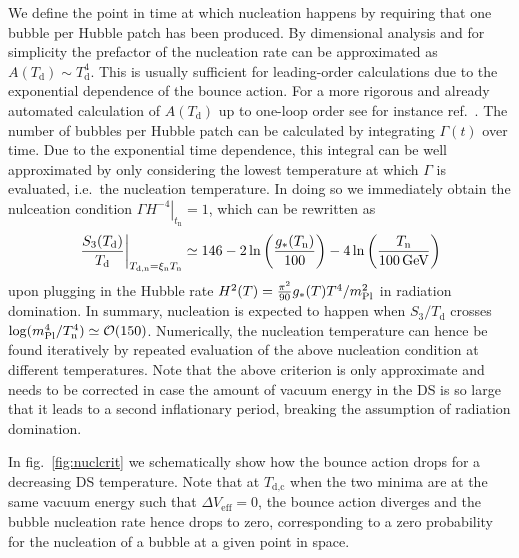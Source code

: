 We define the point in time at which nucleation happens by requiring that one bubble per Hubble patch has been produced. By dimensional analysis and for simplicity the prefactor of the nucleation rate can be approximated as $A(T_\mathrm{d}) \sim T_\mathrm{d}^4$. This is usually sufficient for leading-order calculations due to the exponential dependence of the bounce action. For a more rigorous and already automated calculation of $A(T_\text{d})$ up to one-loop order see for instance ref.~\cite{Ekstedt:2023sqc}. The number of  bubbles per Hubble patch can be calculated by integrating $\Gamma(t)$ over time. Due to the exponential time dependence, this integral can be well approximated by only considering the lowest temperature at which $\Gamma$ is evaluated, i.e.~the nucleation temperature. In doing so we immediately obtain the nulceation condition $\left. \Gamma H^{-4}\right|_{t_\text{n}} = 1$, which can be rewritten as~\cite{Caprini:2015zlo}
\begin{align}
	\left.\frac{S_3(T_\text{d})}{T_\text{d}}\right|_{T_\text{d,n} = \xi_\text{n} T_\text{n}} \simeq 146 - 2 \ln \left( \frac{g_{*}(T_\text{n})}{100} \right) - 4 \ln \left( \frac{T_\text{n}}{100 \, \text{GeV}} \right)
	\label{eq:nuclcrit}
\end{align}
upon plugging in the Hubble rate $H^2(T) = \frac{\pi^2}{90} g_*(T) T^4/m_\text{Pl}^2$ in radiation domination. In summary, nucleation is expected to happen when $S_3/T_\text{d}$ crosses $\log(m_\text{Pl}^4/T_\text{n}^4) \simeq \mathcal{O}(150)$. Numerically, the nucleation temperature can hence be found iteratively by repeated evaluation of the above nucleation condition at different temperatures. Note that the above criterion is only approximate and needs to be corrected in case the amount of vacuum energy in the \ac{DS} is so large that it leads to a second inflationary period, breaking the assumption of radiation domination. 

In fig.~\ref{fig:nuclcrit} we schematically show how the bounce action drops for a decreasing \ac{DS} temperature. Note that at $T_\text{d,c}$ when the two minima are at the same vacuum energy such that $\Delta V_\text{eff} = 0$, the bounce action diverges and the bubble nucleation rate hence drops to zero, corresponding to a zero probability for the nucleation of a bubble at a given point in space.

